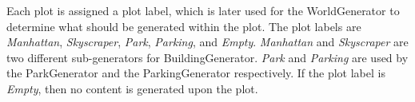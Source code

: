 Each plot is assigned a plot label, which is later used for the WorldGenerator to determine what should be generated within the plot.
The plot labels are \textit{Manhattan}, \textit{Skyscraper}, \textit{Park}, \textit{Parking}, and \textit{Empty}.
\textit{Manhattan} and \textit{Skyscraper} are two different sub-generators for BuildingGenerator. 
\textit{Park} and \textit{Parking} are used by the ParkGenerator and the ParkingGenerator respectively.
If the plot label is \textit{Empty}, then no content is generated upon the plot. 
